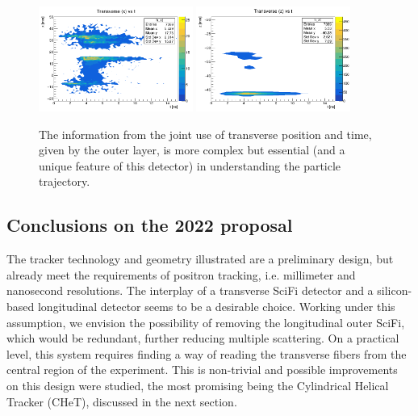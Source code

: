 \begin{refsection}
        \begin{figure}
            \centering
            \includegraphics[width=0.45\textwidth]{Figures/muEDM/Tracker/fPosInXfTimeIn.png}
            \includegraphics[width=0.45\textwidth]{Figures/muEDM/Tracker/fPosInZfTimeIn.png}
            \caption{The information from the joint use of transverse position and time, given by the outer layer, is more complex but essential (and a unique feature of this detector) in understanding the particle trajectory.}
        \label{fig:geant4_time_pos_transverse}
        \end{figure}

    \subsection{Conclusions on the 2022 proposal}
        The tracker technology and geometry illustrated are a preliminary design, but already meet the requirements of positron tracking, i.e. millimeter and nanosecond resolutions. 
        The interplay of a transverse SciFi detector and a silicon-based longitudinal detector seems to be a desirable choice. 
        Working under this assumption, we envision the possibility of removing the longitudinal outer SciFi, which would be redundant, further reducing multiple scattering. 
        On a practical level, this system requires finding a way of reading the transverse fibers from the central region of the experiment.
        This is non-trivial and possible improvements on this design were studied, the most promising being the Cylindrical Helical Tracker (CHeT), discussed in the next section.
        

\end{refsection}
